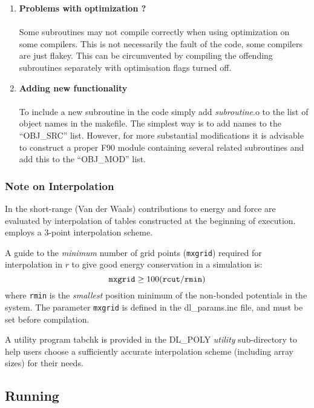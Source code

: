 \begin{enumerate}
\item {\bf Problems with optimization ?}\\~\\
Some subroutines may not compile correctly when using optimization on
some compilers. This is not necessarily the fault of the \D{} code, some
compilers are just flakey. This can be circumvented by compiling the offending
subroutines separately with optimisation flags turned off.
\item {\bf Adding new functionality} \\~\\ To include a new subroutine in the
code simply add {\em subroutine}.o to the list of object names in the
makefile. The simplest way is to add names to the ``OBJ\_SRC'' list. However,
for more substantial modifications it is advisable to construct a proper F90
module containing several related subroutines and add this to the ``OBJ\_MOD''
list.
\end{enumerate}

\subsubsection{Note on Interpolation}
\label{interpol}

In \D{} the short-range (Van der Waals)
contributions to energy and force are evaluated by interpolation of
tables constructed at the beginning of execution. \D{} employs a 3-point
interpolation scheme.

A guide to the {\em minimum} number of grid points ({\tt mxgrid})
required for interpolation in $r$ to
give good energy conservation in a simulation is:
\[{\tt mxgrid} \ge 100 ({\tt rcut/rmin})\]
where {\tt rmin} is the {\em smallest} position minimum of the
non-bonded potentials in the system.  The parameter {\tt mxgrid} is
defined in the {\sc dl\_params.inc} file, and must be set before
compilation.

A utility program {\sc tabchk} is provided in the DL\_POLY {\em
utility} sub-directory to help users choose a sufficiently accurate 
interpolation scheme (including array sizes) for their needs.

\subsection{Running \D{}}

